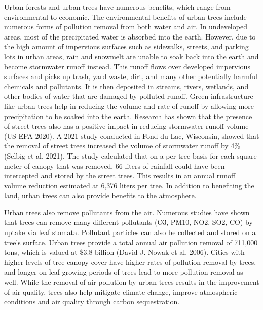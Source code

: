 \documentclass[12pt,twoside]{reedthesis}
\begin{document}
Urban forests and urban trees have numerous benefits, which range from
environmental to economic. The environmental benefits of urban trees
include numerous forms of pollution removal from both water and air. In
undeveloped areas, most of the precipitated water is absorbed into the
earth. However, due to the high amount of impervious surfaces such as
sidewalks, streets, and parking lots in urban areas, rain and snowmelt
are unable to soak back into the earth and become stormwater runoff
instead. This runoff flows over developed impervious surfaces and picks
up trash, yard waste, dirt, and many other potentially harmful chemicals
and pollutants. It is then deposited in streams, rivers, wetlands, and
other bodies of water that are damaged by polluted runoff. Green
infrastructure like urban trees help in reducing the volume and rate of
runoff by allowing more precipitation to be soaked into the earth.
Research has shown that the presence of street trees also has a positive
impact in reducing stormwater runoff volume (US EPA 2020). A 2021 study
conducted in Fond du Lac, Wisconsin, showed that the removal of street
trees increased the volume of stormwater runoff by 4\% (Selbig et al. 2021). The
study calculated that on a per-tree basis for each square meter of
canopy that was removed, 66 liters of rainfall could have been
intercepted and stored by the street trees. This results in an annual
runoff volume reduction estimated at 6,376 liters per tree. In addition
to benefiting the land, urban trees can also provide benefits to the
atmosphere.

Urban trees also remove pollutants from the air. Numerous studies have
shown that trees can remove many different pollutants (O3, PM10, NO2,
SO2, CO) by uptake via leaf stomata. Pollutant particles can also be
collected and stored on a tree's surface. Urban trees provide a total
annual air pollution removal of 711,000 tons, which is valued at \$3.8
billion (David J. Nowak et al. 2006). Cities with higher levels of tree canopy cover
have higher rates of pollution removal by trees, and longer on-leaf
growing periods of trees lead to more pollution removal as well. While
the removal of air pollution by urban trees results in the improvement
of air quality, trees also help mitigate climate change, improve
atmospheric conditions and air quality through carbon sequestration.
\end{document}

